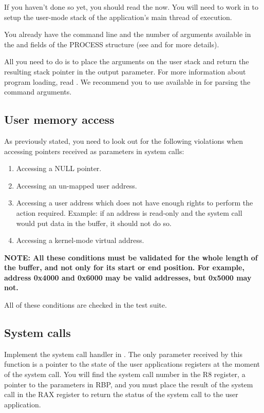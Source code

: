 If you haven't done so yet, you should read the  now. You will need to work in
 to setup the user-mode stack of the application's main
thread of execution.

You already have the command line and the number of arguments available in the 
and  fields of the PROCESS structure (see  and
 for more details).

All you need to do is to place the arguments on the user stack and return the resulting stack
pointer in the  output parameter. For more information about program loading,
read . We recommend you to use  available in 
for parsing the command arguments.

\subsection{User memory access}

As previously stated, you need to look out for the following violations when accessing
pointers received as parameters in system calls:
\begin{enumerate}
	\item Accessing a NULL pointer.
	\item Accessing an un-mapped user address.
	\item Accessing a user address which does not have enough rights to perform the action required.
Example: if an address is read-only and the system call would put data in the buffer, it should not
do so.
	\item Accessing a kernel-mode virtual address.
\end{enumerate}

\textbf{NOTE: All these conditions must be validated for the whole length of the buffer, and not only
for its start or end position. For example, address 0x4000 and 0x6000 may be valid addresses, but 0x5000
may not.}

All of these conditions are checked in the test suite.

\subsection{System calls}

Implement the system call handler in . The only parameter received by this
function is a pointer to the state of the user applications registers at the moment of the system
call. You will find the system call number in the R8 register, a pointer to the parameters in RBP,
and you must place the result of the system call in the RAX register to return the status of the
system call to the user application.

